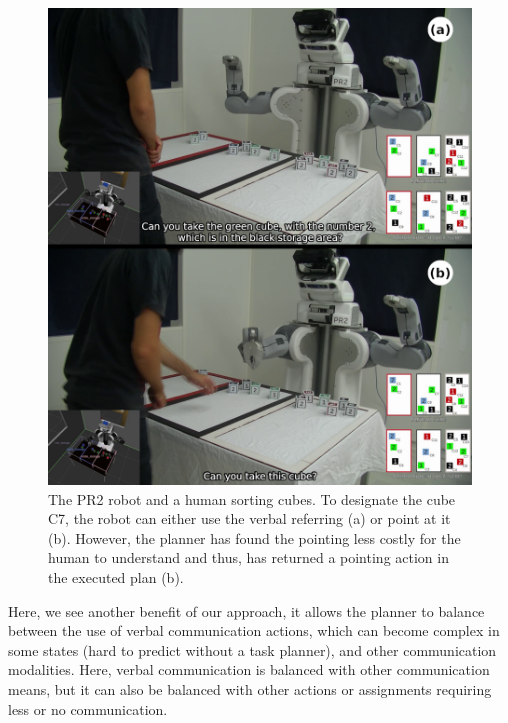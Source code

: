 \documentclass[a4paper,11pt,twoside]{StyleThese}
\begin{document}
\begin{figure}[htb!]
\centering
\includegraphics[width=\textwidth]{figures/chapter3/Chap3point.png}
\caption{The PR2 robot and a human sorting cubes. To designate the cube C7, the robot can either use the verbal referring (a) or point at it (b). However, the planner has found the pointing less costly for the human to understand and thus, has returned a pointing action in the executed plan (b).}
\label{fig:tellorpoint}
\end{figure}

Here, we see another benefit of our approach, it allows the planner to balance between the use of verbal communication actions, which can become complex in some states (hard to predict without a task planner), and other communication modalities. %
Here, verbal communication is balanced with other communication means, but it can also be balanced with other actions or assignments requiring less or no communication.
\end{document}

